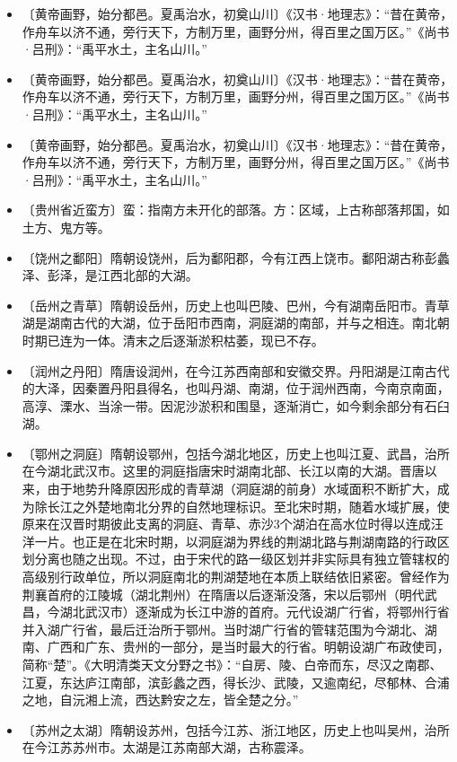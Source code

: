 \documentclass[12pt,UTF-8,openany,a4]{ctexbook}
\begin{document}
\begin{itemize}
    \item〔黄帝画野，始分都邑。夏禹治水，初奠山川〕{\yiwen 《汉书·地理志》：“昔在黄帝，作舟车以济不通，旁行天下，方制万里，画野分州，得百里之国万区。”《尚书·吕刑》：“禹平水土，主名山川。”}
    \item〔黄帝画野，始分都邑。夏禹治水，初奠山川〕{\yiwen 《汉书·地理志》：“昔在黄帝，作舟车以济不通，旁行天下，方制万里，画野分州，得百里之国万区。”《尚书·吕刑》：“禹平水土，主名山川。”}
    \item〔黄帝画野，始分都邑。夏禹治水，初奠山川〕{\yiwen 《汉书·地理志》：“昔在黄帝，作舟车以济不通，旁行天下，方制万里，画野分州，得百里之国万区。”《尚书·吕刑》：“禹平水土，主名山川。”}
    \item〔贵州省近蛮方〕{\yiwen 蛮：指南方未开化的部落。方：区域，上古称部落邦国，如土方、鬼方等。}
    \item〔饶州之鄱阳〕{\yiwen 隋朝设饶州，后为鄱阳郡，今有江西上饶市。鄱阳湖古称彭蠡泽、彭泽，是江西北部的大湖。}
    \item〔岳州之青草〕{\yiwen 隋朝设岳州，历史上也叫巴陵、巴州，今有湖南岳阳市。青草湖是湖南古代的大湖，位于岳阳市西南，洞庭湖的南部，并与之相连。南北朝时期已连为一体。清末之后逐渐淤积枯萎，现已不存。}
    \item〔润州之丹阳〕{\yiwen 隋唐设润州，在今江苏西南部和安徽交界。丹阳湖是江南古代的大泽，因秦置丹阳县得名，也叫丹湖、南湖，位于润州西南，今南京南面，高淳、溧水、当涂一带。因泥沙淤积和围垦，逐渐消亡，如今剩余部分有石臼湖。}
    \item〔鄂州之洞庭〕{\yiwen 隋朝设鄂州，包括今湖北地区，历史上也叫江夏、武昌，治所在今湖北武汉市。这里的洞庭指唐宋时湖南北部、长江以南的大湖。晋唐以来，由于地势升降原因形成的青草湖（洞庭湖的前身）水域面积不断扩大，成为除长江之外楚地南北分界的自然地理标识。至北宋时期，随着水域扩展，使原来在汉晋时期彼此支离的洞庭、青草、赤沙3个湖泊在高水位时得以连成汪洋一片。也正是在北宋时期，以洞庭湖为界线的荆湖北路与荆湖南路的行政区划分离也随之出现。不过，由于宋代的路一级区划并非实际具有独立管辖权的高级别行政单位，所以洞庭南北的荆湖楚地在本质上联结依旧紧密。曾经作为荆襄首府的江陵城（湖北荆州）在隋唐以后逐渐没落，宋以后鄂州（明代武昌，今湖北武汉市）逐渐成为长江中游的首府。元代设湖广行省，将鄂州行省并入湖广行省，最后迁治所于鄂州。当时湖广行省的管辖范围为今湖北、湖南、广西和广东、贵州的一部分，是当时最大的行省。明朝设湖广布政使司，简称“楚”。《大明清类天文分野之书》：“自房、陵、白帝而东，尽汉之南郡、江夏，东达庐江南部，滨彭蠡之西，得长沙、武陵，又逾南纪，尽郁林、合浦之地，自沅湘上流，西达黔安之左，皆全楚之分。”}
    \item〔苏州之太湖〕{\yiwen 隋朝设苏州，包括今江苏、浙江地区，历史上也叫吴州，治所在今江苏苏州市。太湖是江苏南部大湖，古称震泽。}
\end{itemize}
\end{document}
